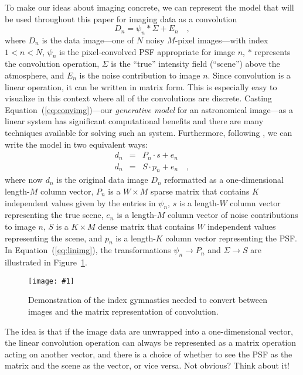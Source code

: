 \documentclass[12pt,preprint]{aastex}
\newcommand{\Fig}[1]{Figure~\ref{fig:#1}}
\newcommand{\fig}[1]{\Fig{#1}}
\newcommand{\figlabel}[1]{\label{fig:#1}}
\newcommand{\Eq}[1]{Equation~(\ref{eq:#1})}
\newcommand{\eq}[1]{\Eq{#1}}
\newcommand{\eqlabel}[1]{\label{eq:#1}}
\newcommand{\data}{\ensuremath{D}}
\newcommand{\scene}{\ensuremath{\Sigma}}
\newcommand{\psf}{\ensuremath{\psi}}
\newcommand{\dvec}{\ensuremath{d}}
\newcommand{\evec}{\ensuremath{e}}
\newcommand{\svec}{\ensuremath{s}}
\newcommand{\smat}{\ensuremath{S}}
\newcommand{\pvec}{\ensuremath{p}}
\newcommand{\pmat}{\ensuremath{P}}
\newcommand{\dfmplot}[1]{%
\begin{center}%
    \texttt{[image: \#1]}%
\end{center}%
}
\begin{document}
To make our ideas about imaging concrete, we can represent the model
that will be used throughout this paper for imaging data as a
convolution
\begin{equation}\eqlabel{convimg}
    \data_n = \psf_n \ast \scene + E_n \quad,
\end{equation}
where $\data_n$ is the data image---one of $N$ noisy $M$-pixel
images---with index $1<n<N$, $\psf_n$ is the pixel-convolved PSF
appropriate for image $n$, $\ast$ represents the convolution
operation, $\scene$ is the ``true'' intensity field (``scene'') above
the atmosphere, and $E_n$ is the noise contribution to image $n$.
Since convolution is a linear operation, it can be written in matrix
form. This is especially easy to visualize in this context where all of
the convolutions are discrete. Casting \eq{convimg}---our
\emph{generative model} for an astronomical image---as a linear system
has significant computational benefits and there are many techniques
available for solving such an system. Furthermore, following
\citet{hirsch}, we can write the model in two equivalent ways:
\begin{eqnarray}\eqlabel{linimg}\displaystyle
\dvec_n &=& \pmat_n \cdot \svec + \evec_n
\\
\dvec_n &=& \smat \cdot \pvec_n + \evec_n
\quad ,
\end{eqnarray}
where now $\dvec_n$ is the original data image $\data_n$ reformatted as a
one-dimensional length-$M$ column vector, $\pmat_n$ is a $W\times M$
sparse matrix that contains $K$ independent values given by the entries
in $\psf_n$, $s$ is a length-$W$ column vector representing the true
scene, $\evec_n$ is a length-$M$ column vector of noise contributions to
image $n$, $\smat$ is a $K\times M$ dense matrix that contains $W$
independent values representing the scene, and $\pvec_n$ is a length-$K$
column vector representing the PSF. In \eq{linimg}, the transformations
$\psf_n \to \pmat_n$ and $\scene \to \smat$ are illustrated in \fig{index}.

\begin{figure}[!htbp]
    \dfmplot{index_gymnastics.pdf}
    \caption{Demonstration of the index gymnastics needed to convert between
        images and the matrix representation of convolution.\figlabel{index}}
\end{figure}

The idea is that if the image data are unwrapped into a
one-dimensional vector, the linear convolution operation can always be
represented as a matrix operation acting on another vector, and there
is a choice of whether to see the PSF as the matrix and the scene as
the vector, or vice versa.  Not obvious?  Think about it!
\end{document}
